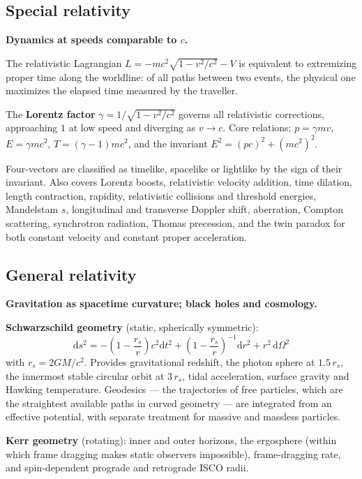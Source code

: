 \documentclass[11pt,a4paper]{article}
\newcommand{\ud}{\mathrm{d}}
\begin{document}
\subsection{Special relativity}

\textbf{Dynamics at speeds comparable to $c$.}

The relativistic Lagrangian $L = -mc^2\sqrt{1 - v^2/c^2} - V$ is equivalent to extremizing proper time
along the worldline: of all paths between two events, the physical one maximizes the elapsed time
measured by the traveller.

The \textbf{Lorentz factor} $\gamma = 1/\sqrt{1 - v^2/c^2}$ governs all relativistic corrections,
approaching $1$ at low speed and diverging as $v \to c$. Core relations: $p = \gamma mv$,
$E = \gamma mc^2$, $T = (\gamma - 1)mc^2$, and the invariant $E^2 = (pc)^2 + (mc^2)^2$.

Four-vectors are classified as timelike, spacelike or lightlike by the sign of their invariant. Also
covers Lorentz boosts, relativistic velocity addition, time dilation, length contraction, rapidity,
relativistic collisions and threshold energies, Mandelstam $s$, longitudinal and transverse Doppler
shift, aberration, Compton scattering, synchrotron radiation, Thomas precession, and the twin paradox
for both constant velocity and constant proper acceleration.

\subsection{General relativity}

\textbf{Gravitation as spacetime curvature; black holes and cosmology.}

\textbf{Schwarzschild geometry} (static, spherically symmetric):
\begin{equation}
\ud s^2 = -\left(1 - \frac{r_s}{r}\right)c^2\ud t^2
        + \left(1 - \frac{r_s}{r}\right)^{-1}\!\ud r^2 + r^2\,\ud\Omega^2
\end{equation}
with $r_s = 2GM/c^2$. Provides gravitational redshift, the photon sphere at $1.5\,r_s$, the innermost
stable circular orbit at $3\,r_s$, tidal acceleration, surface gravity and Hawking temperature.
Geodesics --- the trajectories of free particles, which are the straightest available paths in curved
geometry --- are integrated from an effective potential, with separate treatment for massive and
massless particles.

\textbf{Kerr geometry} (rotating): inner and outer horizons, the ergosphere (within which frame
dragging makes static observers impossible), frame-dragging rate, and spin-dependent prograde and
retrograde ISCO radii.
\end{document}

